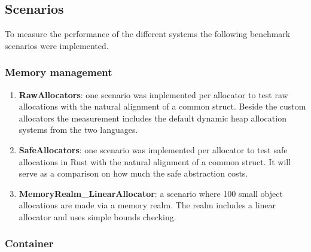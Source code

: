 \subsection{Scenarios}

To measure the performance of the different systems the following benchmark scenarios were implemented. 

\subsubsection{Memory management}

\begin{enumerate}
	\item \textbf{RawAllocators}: one scenario was implemented per allocator to test raw allocations with the natural alignment of a common struct. Beside the custom allocators the measurement includes the default dynamic heap allocation systems from the two languages.
	
	\item \textbf{SafeAllocators}: one scenario was implemented per allocator to test safe allocations in Rust with the natural alignment of a common struct. It will serve as a comparison on how much the safe abstraction costs.
	
	\item \textbf{MemoryRealm\_LinearAllocator}: a scenario where 100 small object allocations are made via a memory realm. The realm includes a linear allocator and uses simple bounds checking.
\end{enumerate}

\subsubsection{Container}


